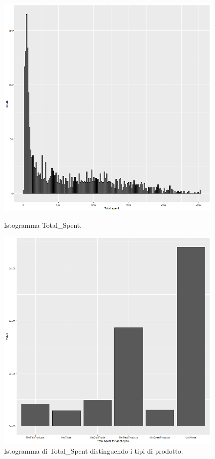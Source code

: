 \documentclass[letterpaper,11pt]{article}
\begin{document}
\begin{figure}[H]
  \centering
  \begin{minipage}[b]{0.4\textwidth}
    \includegraphics[width=\textwidth]{Img/EDA/EDA016.png}
    \caption{Istogramma Total\_Spent.}
    \label{fig:IstogrammaTs}
  \end{minipage}
  \hfill
  \begin{minipage}[b]{0.4\textwidth}
    \includegraphics[width=\textwidth]{Img/EDA/EDA017.png}
    \caption{Istogramma di Total\_Spent distinguendo i tipi di prodotto.}
    \label{fig:IstogrammaTsTypeProduct}
  \end{minipage}
\end{figure}
\end{document}
